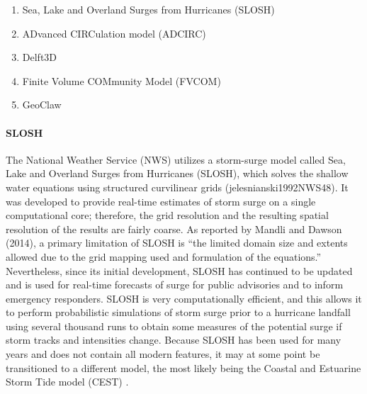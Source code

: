 \begin{enumerate}
    \item Sea, Lake and Overland Surges from Hurricanes  (SLOSH)
    \item ADvanced CIRCulation model (ADCIRC)
    \item Delft3D 
    \item Finite Volume COMmunity Model (FVCOM)
    \item GeoClaw
\end{enumerate}

\paragraph{SLOSH} The National Weather Service (NWS) utilizes a storm-surge model called Sea, Lake and Overland Surges from Hurricanes (SLOSH), which solves the shallow water equations using structured curvilinear grids (jelesnianski1992NWS48). It was developed to provide real-time estimates of storm surge on a single computational core; therefore, the grid resolution and the resulting spatial resolution of the results are fairly coarse. As reported by Mandli and Dawson (2014), a primary limitation of SLOSH is “the limited domain size and extents allowed due to the grid mapping used and formulation of the equations.” Nevertheless, since its initial development, SLOSH has continued to be updated and is used for real-time forecasts of surge for public advisories and to inform emergency responders. SLOSH is very computationally efficient, and this allows it to perform probabilistic simulations of storm surge prior to a hurricane landfall using several thousand runs to obtain some measures of the potential surge if storm tracks and intensities change. Because SLOSH has been used for many years and does not contain all modern features, it may at some point be transitioned to a different model, the most likely being the Coastal and Estuarine Storm Tide model (CEST) \citep{zhang2017transition}. 

